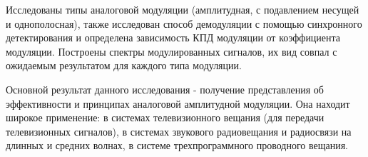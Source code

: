 Исследованы типы аналоговой модуляции (амплитудная, с подавлением несущей и однополосная), также исследован способ демодуляции с помощью синхронного детектирования и определена зависимость КПД модуляции от коэффициента модуляции. Построены спектры модулированных сигналов, их вид совпал с ожидаемым результатом для каждого типа модуляции.

Основной результат данного исследования - получение представления об эффективности и принципах аналоговой амплитудной модуляции. Она находит широкое применение: в системах телевизионного вещания (для передачи телевизионных сигналов), в системах звукового радиовещания и радиосвязи на длинных и средних волнах,
в системе трехпрограммного проводного вещания.


